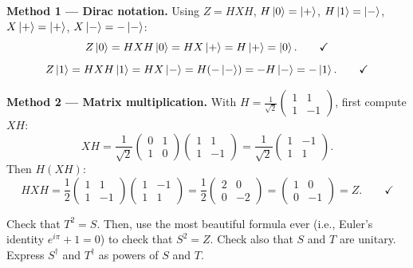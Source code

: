 \documentclass{ceri/sty/rapport}
\newcounter{exercice}[section]
\begin{document}
\begin{solution}
\textbf{Method 1 — Dirac notation.}
Using $Z=HXH$, $H\ket{0}=\ket{+}$, $H\ket{1}=\ket{-}$, $X\ket{+}=\ket{+}$, $X\ket{-}=-\ket{-}$:
\[
  Z\ket{0} = HXH\ket{0} = HX\ket{+} = H\ket{+} = \ket{0}.\qquad\checkmark
\]
\[
  Z\ket{1} = HXH\ket{1} = HX\ket{-} = H(-\ket{-}) = -H\ket{-} = -\ket{1}.\qquad\checkmark
\]

\medskip\noindent
\textbf{Method 2 — Matrix multiplication.}
With $H=\tfrac{1}{\sqrt{2}}\begin{pmatrix}1&1\\1&-1\end{pmatrix}$, first compute $XH$:
\[
  XH = \frac{1}{\sqrt{2}}\begin{pmatrix}0&1\\1&0\end{pmatrix}\begin{pmatrix}1&1\\1&-1\end{pmatrix}
     = \frac{1}{\sqrt{2}}\begin{pmatrix}1&-1\\1&1\end{pmatrix}.
\]
Then $H(XH)$:
\[
  HXH = \frac{1}{2}\begin{pmatrix}1&1\\1&-1\end{pmatrix}\begin{pmatrix}1&-1\\1&1\end{pmatrix}
      = \frac{1}{2}\begin{pmatrix}2&0\\0&-2\end{pmatrix}
      = \begin{pmatrix}1&0\\0&-1\end{pmatrix} = Z.\qquad\checkmark
\]
\end{solution}

\begin{exercice}[p.~18]
Check that $T^2 = S$. Then, use the most beautiful formula ever
(i.e., Euler's identity $e^{i\pi}+1=0$) to check that $S^2 = Z$.
Check also that $S$ and $T$ are unitary.
Express $S^\dagger$ and $T^\dagger$ as powers of $S$ and $T$.
\end{exercice}
\end{document}
